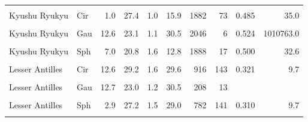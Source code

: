 \begin{ThreePartTable}
\begin{longtable}[t]{llrrrrrrrr}
\cellcolor{gray!6}{Kyushu Ryukyu} & \cellcolor{gray!6}{Bes} & \cellcolor{gray!6}{13.4} & \cellcolor{gray!6}{22.9} & \cellcolor{gray!6}{1.5} & \cellcolor{gray!6}{12.6} & \cellcolor{gray!6}{2045} & \cellcolor{gray!6}{4} & \cellcolor{gray!6}{0.509} & \cellcolor{gray!6}{35.1}\\
Kyushu Ryukyu & Cir & 1.0 & 27.4 & 1.0 & 15.9 & 1882 & 73 & 0.485 & 35.0\\
\cellcolor{gray!6}{Kyushu Ryukyu} & \cellcolor{gray!6}{Exp} & \cellcolor{gray!6}{12.9} & \cellcolor{gray!6}{23.3} & \cellcolor{gray!6}{1.8} & \cellcolor{gray!6}{10.9} & \cellcolor{gray!6}{2047} & \cellcolor{gray!6}{6} & \cellcolor{gray!6}{0.513} & \cellcolor{gray!6}{32.5}\\
Kyushu Ryukyu & Gau & 12.6 & 23.1 & 1.1 & 30.5 & 2046 & 6 & 0.524 & 1010763.0\\
\cellcolor{gray!6}{Kyushu Ryukyu} & \cellcolor{gray!6}{Lin} & \cellcolor{gray!6}{1.0} & \cellcolor{gray!6}{20.5} & \cellcolor{gray!6}{1.5} & \cellcolor{gray!6}{31.9} & \cellcolor{gray!6}{1873} & \cellcolor{gray!6}{119} & \cellcolor{gray!6}{0.484} & \cellcolor{gray!6}{35.8}\\
Kyushu Ryukyu & Sph & 7.0 & 20.8 & 1.6 & 12.8 & 1888 & 17 & 0.500 & 32.6\\
\cellcolor{gray!6}{Lesser Antilles} & \cellcolor{gray!6}{Bes} & \cellcolor{gray!6}{17.2} & \cellcolor{gray!6}{21.9} & \cellcolor{gray!6}{1.5} & \cellcolor{gray!6}{29.8} & \cellcolor{gray!6}{305} & \cellcolor{gray!6}{13} & \cellcolor{gray!6}{0.356} & \cellcolor{gray!6}{10.5}\\
Lesser Antilles & Cir & 12.6 & 29.2 & 1.6 & 29.6 & 916 & 143 & 0.321 & 9.7\\
\cellcolor{gray!6}{Lesser Antilles} & \cellcolor{gray!6}{Exp} & \cellcolor{gray!6}{11.6} & \cellcolor{gray!6}{19.7} & \cellcolor{gray!6}{1.6} & \cellcolor{gray!6}{29.0} & \cellcolor{gray!6}{3424} & \cellcolor{gray!6}{409} & \cellcolor{gray!6}{0.319} & \cellcolor{gray!6}{9.7}\\
Lesser Antilles & Gau & 12.7 & 23.0 & 1.2 & 30.5 & 208 & 13 &  & \\
\cellcolor{gray!6}{Lesser Antilles} & \cellcolor{gray!6}{Lin} & \cellcolor{gray!6}{17.3} & \cellcolor{gray!6}{21.6} & \cellcolor{gray!6}{1.6} & \cellcolor{gray!6}{29.2} & \cellcolor{gray!6}{616} & \cellcolor{gray!6}{75} & \cellcolor{gray!6}{0.318} & \cellcolor{gray!6}{9.7}\\
Lesser Antilles & Sph & 2.9 & 27.2 & 1.5 & 29.0 & 782 & 141 & 0.310 & 9.7\\
\cellcolor{gray!6}{N Philippines} & \cellcolor{gray!6}{Bes} & \cellcolor{gray!6}{20.0} & \cellcolor{gray!6}{23.7} & \cellcolor{gray!6}{7.3} & \cellcolor{gray!6}{14.7} & \cellcolor{gray!6}{1446} & \cellcolor{gray!6}{24} & \cellcolor{gray!6}{0.544} & \cellcolor{gray!6}{33.2}\\

\end{longtable}
\end{ThreePartTable}
